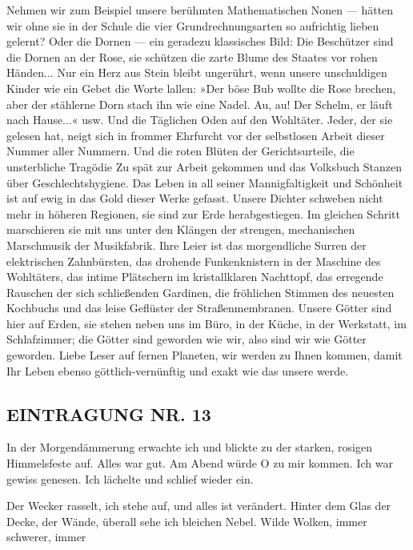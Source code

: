 Nehmen wir zum Beispiel unsere berühmten Mathematischen Nonen —
hätten wir ohne sie in der Schule die vier Grundrechnungsarten so
aufrichtig lieben gelernt? Oder die Dornen — ein geradezu
klassisches Bild: Die Beschützer sind die Dornen an der Rose, sie
schützen die zarte Blume des Staates vor rohen Händen... Nur ein
Herz aus Stein bleibt ungerührt, wenn unsere unschuldigen Kinder
wie ein Gebet die Worte lallen: »Der böse Bub wollte die Rose
brechen, aber der stählerne Dorn stach ihn wie eine Nadel. Au, au!
Der Schelm, er läuft nach Hause...« usw. Und die Täglichen Oden auf
den Wohltäter. Jeder, der sie gelesen hat, neigt sich in frommer
Ehrfurcht vor der selbstlosen Arbeit dieser Nummer aller Nummern.
Und die roten Blüten der Gerichtsurteile, die unsterbliche Tragödie
Zu spät zur Arbeit gekommen und das Volksbuch Stanzen über
Geschlechtshygiene. Das Leben in all seiner Mannigfaltigkeit und
Schönheit ist auf ewig in das Gold dieser Werke gefasst. Unsere
Dichter schweben nicht mehr in höheren Regionen, sie sind zur Erde
herabgestiegen. Im gleichen Schritt marschieren sie mit uns unter
den Klängen der strengen, mechanischen Marschmusik der Musikfabrik.
Ihre Leier ist das morgendliche Surren der elektrischen
Zahnbürsten, das drohende Funkenknistern in der Maschine des
Wohltäters, das intime Plätschern im kristallklaren Nachttopf, das
erregende Rauschen der sich schließenden Gardinen, die fröhlichen
Stimmen des neuesten Kochbuchs und das leise Geflüster der
Straßenmembranen. Unsere Götter sind hier auf Erden, sie stehen
neben uns im Büro, in der Küche, in der Werkstatt, im Schlafzimmer;
die Götter sind geworden wie wir, also sind wir wie Götter
geworden. Liebe Leser auf fernen Planeten, wir werden zu Ihnen
kommen, damit Ihr Leben ebenso göttlich-vernünftig und exakt wie
das unsere werde.

\subsection{EINTRAGUNG NR. 13}

In der Morgendämmerung erwachte ich und blickte zu der starken,
rosigen Himmelsfeste auf. Alles war gut. Am Abend würde O zu mir
kommen. Ich war gewiss genesen. Ich lächelte und schlief wieder
ein.

Der Wecker rasselt, ich stehe auf, und alles ist verändert. Hinter
dem Glas der Decke, der Wände, überall sehe ich bleichen Nebel.
Wilde Wolken, immer schwerer, immer

